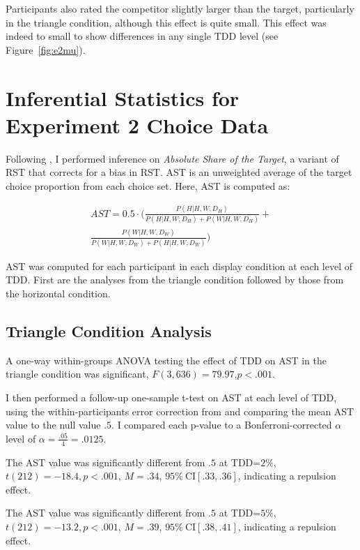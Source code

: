 Participants also rated the competitor slightly larger than the target, particularly in the triangle condition, although this effect is quite small. This effect was indeed to small to show differences in any single TDD level (see Figure~\ref{fig:e2mu}). 

\chapter{Inferential Statistics for Experiment 2 Choice Data}

Following \textcite{katsimpokisRobustBayesianTest2022}, I performed inference on \textit{Absolute Share of the Target}, a variant of RST that corrects for a bias in RST. AST is an unweighted average of the target choice proportion from each choice set. Here, AST is computed as:

\begin{equation}
    \begin{aligned}
        AST=0.5 \cdot (\frac{P(H|{H,W,D_{H}})}{P(H|{H,W,D_{H}})+P(W|{H,W,D_{H}})}+ \\
        \frac{P(W|{H,W,D_{W}})}{P(W|{H,W,D_{W}})+P(H|{H,W,D_{W}})})
    \end{aligned}
\end{equation}

AST was computed for each participant in each display condition at each level of TDD. First are the analyses from the triangle condition followed by those from the horizontal condition. 

\section{Triangle Condition Analysis}
A one-way within-groups ANOVA testing the effect of TDD on AST in the triangle condition was significant, $\mathit{F}(3,636)=79.97$,$\mathit{p}<.001$. 

I then performed a follow-up one-sample t-test on AST at each level of TDD, using the within-participants error correction from \textcite{cousineau2014error} and comparing the mean AST value to the null value $.5$. I compared each p-value to a Bonferroni-corrected $\alpha$ level of $\alpha=\frac{.05}{4}=.0125$. 

The AST value was significantly different from $.5$ at TDD=$2\%$, $\mathit{t}(212)=-18.4,\textit{p}<.001$, $\mathit{M}=.34$, $95\%\ \mathrm{CI}[.33,.36]$, indicating a repulsion effect. 

The AST value was significantly different from $.5$ at TDD=$5\%$, $\mathit{t}(212)=-13.2,\textit{p}<.001$, $\mathit{M}=.39$, $95\%\ \mathrm{CI}[.38,.41]$, indicating a repulsion effect. 

